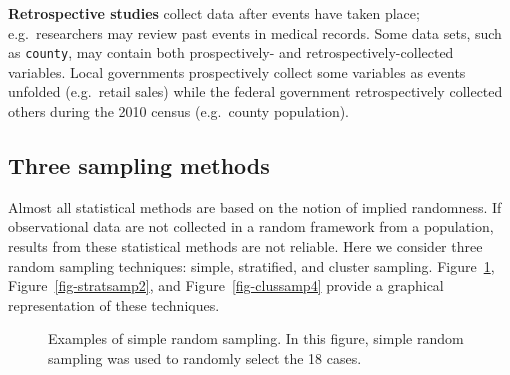 \documentclass[
  letterpaper,
  DIV=11,
  numbers=noendperiod]{scrreprt}
\begin{document}
\textbf{Retrospective studies} collect data after events have taken
place; e.g.~researchers may review past events in medical records. Some
data sets, such as \texttt{county}, may contain both prospectively- and
retrospectively-collected variables. Local governments prospectively
collect some variables as events unfolded (e.g.~retail sales) while the
federal government retrospectively collected others during the 2010
census (e.g.~county population).

\subsection{Three sampling methods}\label{three-sampling-methods}

Almost all statistical methods are based on the notion of implied
randomness. If observational data are not collected in a random
framework from a population, results from these statistical methods are
not reliable. Here we consider three random sampling techniques: simple,
stratified, and cluster sampling. Figure~\ref{fig-simprand},
Figure~\ref{fig-stratsamp2}, and Figure~\ref{fig-clussamp4} provide a
graphical representation of these techniques.

\begin{figure}


\caption{\label{fig-simprand}Examples of simple random sampling. In this
figure, simple random sampling was used to randomly select the 18
cases.}

\end{figure}%
\end{document}
